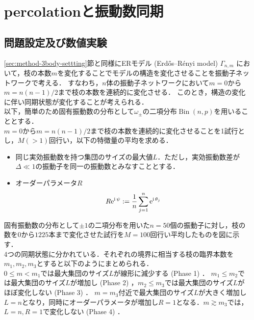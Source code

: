 \documentclass[../main]{subfiles}
\begin{document}
\chapter{percolationと振動数同期}
\label{chap:percolation}
\section{問題設定及び数値実験}
\ref{sec:method-3body-settting}節と同様にERモデル (Erdős–Rényi model) $\Gamma_{n,m}$ において，枝の本数$m$を変化することでモデルの構造を変化させることを振動子ネットワークで考える．
すなわち，$n$体の振動子ネットワークにおいて$m=0$から$m=n(n-1)/2$まで枝の本数を連続的に変化させる．
このとき，構造の変化に伴い同期状態が変化することが考えられる．\\
以下，簡単のため固有振動数の分布として$\omega_\pm$の二項分布$\operatorname{Bin}(n,p)$を用いることとする．\\
$m=0$から$m=n(n-1)/2$まで枝の本数を連続的に変化させることを1試行とし，$M(>1)$回行い，以下の特徴量の平均を求める．
\begin{itemize}
    \item 
    同じ実効振動数を持つ集団のサイズの最大値$L$．ただし，実効振動数差が$\Delta\ll 1$の振動子を同一の振動数とみなすこととする．
    \item
    オーダーパラメータ$R$
    \begin{align*}
        R\mathrm{e}^{{\mathrm i\,} \psi}:=\frac{1}{n}\sum_{j=1}^n\mathrm{e}^{{\mathrm i\,} \theta_j}    
    \end{align*}
\end{itemize}
固有振動数の分布として$\pm 1$の二項分布を用いた$n=50$個の振動子に対し，枝の数を$0$から$1225$本まで変化させた試行を$M=100$回行い平均したものを図に示す．\\
4つの同期状態に分かれている．それぞれの境界に相当する枝の臨界本数を$m_1,m_2,m_3$とすると以下のようにまとめられる．\\
$0\leq m<m_1$では最大集団のサイズ$L$が線形に減少する (Phase 1) ．
$m_1\leq m_2$では最大集団のサイズ$L$が増加し (Phase 2) ，$m_2\leq m_3$では最大集団のサイズ$L$がほぼ変化しない (Phase 3) ．
$m=m_3$付近で最大集団のサイズ$L$が大きく増加し$L=n$となり，同時にオーダーパラメータが増加し$R=1$となる．$m\gtrsim m_3$では，$L=n,R=1$で変化しない (Phase 4) ．
\end{document}
